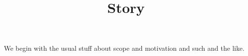 \documentclass[a4paper]{article}
\title{Story}
\author{}
\date{}
\begin{document}
\maketitle

	We begin with the usual stuff about scope and motivation and such and the like.
\end{document}
